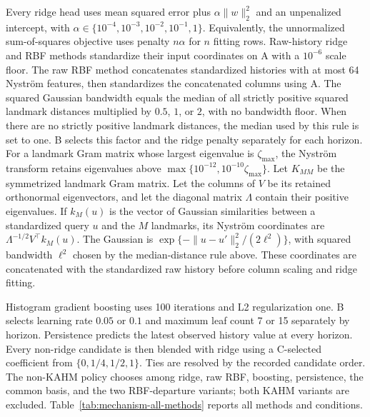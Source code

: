 Every ridge head uses mean squared error plus
$\alpha\|w\|_2^2$ and an unpenalized intercept, with
$\alpha\in\{10^{-4},10^{-3},10^{-2},10^{-1},1\}$. Equivalently,
the unnormalized sum-of-squares objective uses penalty $n\alpha$ for
$n$ fitting rows. Raw-history ridge and RBF methods standardize their
input coordinates on A with a $10^{-6}$ scale floor. The raw RBF method
concatenates standardized histories with at most 64 Nystr\"om features,
then standardizes the concatenated columns using A. The squared Gaussian
bandwidth equals the median of all strictly positive squared landmark
distances multiplied by $0.5$, $1$, or $2$, with no bandwidth floor.
When there are no strictly positive landmark distances, the median
used by this rule is set to one. B
selects this factor and the ridge penalty separately for each horizon.
For a landmark Gram matrix whose largest eigenvalue is $\zeta_{\max}$,
the Nystr\"om transform retains eigenvalues above
$\max\{10^{-12},10^{-10}\zeta_{\max}\}$.
Let $K_{MM}$ be the symmetrized landmark Gram matrix. Let the columns
of $V$ be its retained orthonormal eigenvectors, and let the diagonal
matrix $\Lambda$ contain their positive eigenvalues. If $k_M(u)$ is the vector of Gaussian similarities between
a standardized query $u$ and the $M$ landmarks, its Nystr\"om coordinates
are $\Lambda^{-1/2}V^\top k_M(u)$. The Gaussian is
$\exp\{-\|u-u'\|_2^2/(2\ell^2)\}$, with squared bandwidth $\ell^2$
chosen by the median-distance rule above. These coordinates are
concatenated with the standardized raw history before column scaling
and ridge fitting.

Histogram gradient boosting uses 100 iterations and L2 regularization
one. B selects learning rate $0.05$ or $0.1$ and maximum leaf count
7 or 15 separately by horizon. Persistence predicts the latest observed
history value at every horizon. Every non-ridge candidate is then blended
with ridge using a C-selected coefficient from $\{0,1/4,1/2,1\}$.
Ties are resolved by the recorded candidate order. The non-KAHM policy
chooses among ridge, raw RBF, boosting, persistence, the common basis,
and the two RBF-departure variants; both KAHM variants are excluded.
Table~\ref{tab:mechanism-all-methods} reports all methods and conditions.

\begin{table}[!htbp]
\centering\scriptsize
\setlength{\tabcolsep}{3pt}
\caption{All ten procedures, every declared law and both added-noise levels.
Entries are mean horizon-averaged A-variance-normalized D MSE over 24
repetitions; lower is better. The first six columns enter the nonlinear
aggregate with equal weight. The final two form the separate linear control.
These conditionwise summaries are descriptive. ``Unbounded'' omits only the
departure radial bound. Persistence and raw nonlinear controls include their
C-selected blend with ridge.}
\label{tab:mechanism-all-methods}

\end{table}

